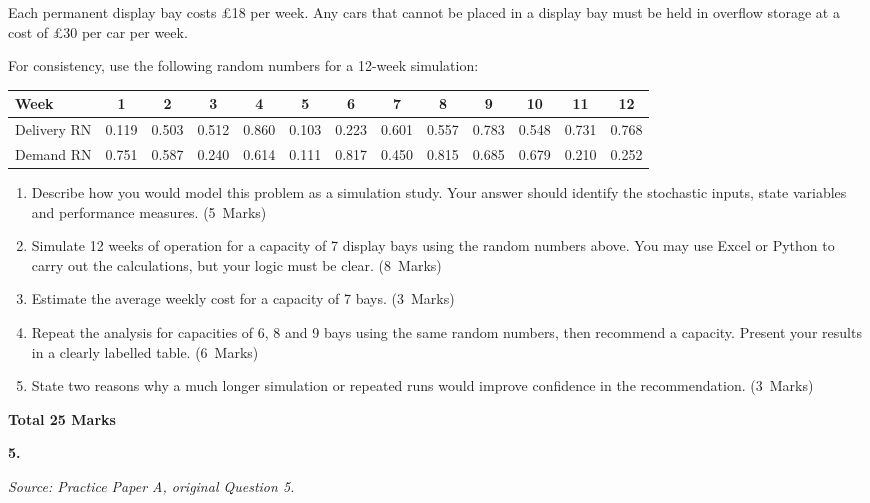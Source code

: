 \documentclass[11pt,a4paper]{article}
\newcommand{\markalloc}[1]{\nobreak\hfill\mbox{(#1 Marks)}}
\newcommand{\questiontotal}[1]{\begin{flushright}\textbf{Total #1 Marks}\end{flushright}}
\begin{document}
Each permanent display bay costs \pounds18 per week.
Any cars that cannot be placed in a display bay must be held in overflow storage at a cost of \pounds30 per car per week.

For consistency, use the following random numbers for a 12-week simulation:

\begin{center}
\scriptsize
\begin{tabular}{lcccccccccccc}
\toprule
Week & 1 & 2 & 3 & 4 & 5 & 6 & 7 & 8 & 9 & 10 & 11 & 12 \\
\midrule
Delivery RN & 0.119 & 0.503 & 0.512 & 0.860 & 0.103 & 0.223 & 0.601 & 0.557 & 0.783 & 0.548 & 0.731 & 0.768 \\
Demand RN & 0.751 & 0.587 & 0.240 & 0.614 & 0.111 & 0.817 & 0.450 & 0.815 & 0.685 & 0.679 & 0.210 & 0.252 \\
\bottomrule
\end{tabular}
\normalsize
\end{center}

\begin{enumerate}
\item Describe how you would model this problem as a simulation study. Your answer should identify the stochastic inputs, state variables and performance measures. \markalloc{5}

\item Simulate 12 weeks of operation for a capacity of 7 display bays using the random numbers above. You may use Excel or Python to carry out the calculations, but your logic must be clear. \markalloc{8}

\item Estimate the average weekly cost for a capacity of 7 bays. \markalloc{3}

\item Repeat the analysis for capacities of 6, 8 and 9 bays using the same random numbers, then recommend a capacity. Present your results in a clearly labelled table. \markalloc{6}

\item State two reasons why a much longer simulation or repeated runs would improve confidence in the recommendation. \markalloc{3}
\end{enumerate}

\questiontotal{25}

\newpage

\textbf{5.}

\textit{Source: Practice Paper A, original Question 5.}
\end{document}
